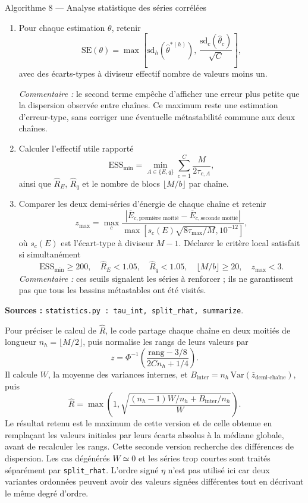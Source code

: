 \documentclass[10pt,a4paper]{article}
\begin{document}
\begin{algocode}{Algorithme 8 --- Analyse statistique des séries corrélées}
\begin{enumerate}
les huit fonctions de l'algorithme 7 puis moyenner sur les chaînes.
\par\textit{Commentaire :} les blocs circulaires évitent de sous-représenter
les bords. Recalculer les variances et le cumulant à chaque tirage transmet
l'incertitude à ces fonctions non linéaires. Le rééchantillonnage est fait
séparément dans chaque chaîne et à chaque température.
\item Pour chaque estimation $\theta$, retenir
\[
\mathrm{SE}(\theta)=\max\!\left[
\mathrm{sd}_{h}(\widehat\theta^{*(h)}),\,
\frac{\mathrm{sd}_{c}(\widehat\theta_c)}{\sqrt C}\right],
\]
avec des écarts-types à diviseur effectif nombre de valeurs moins un.
\par\textit{Commentaire :} le second terme empêche d'afficher une erreur
plus petite que la dispersion observée entre chaînes. Ce maximum reste
une estimation d'erreur-type, sans corriger une éventuelle métastabilité
commune aux deux chaînes.
\item Calculer l'effectif utile rapporté
\[
\mathrm{ESS}_{\min}=\min_{A\in\{E,q\}}
       \sum_{c=1}^C\frac{M}{2\tau_{c,A}},
\]
ainsi que $\widehat R_E$, $\widehat R_q$ et le nombre de blocs
$\lfloor M/b\rfloor$ par chaîne.
\item Comparer les deux demi-séries d'énergie de chaque chaîne et retenir
\[
z_{\max}=\max_c
\frac{|\overline E_{c,\text{première moitié}}
       -\overline E_{c,\text{seconde moitié}}|}
{\max[s_c(E)\sqrt{8\tau_{\max}/M},10^{-12}]},
\]
où $s_c(E)$ est l'écart-type à diviseur $M-1$. Déclarer le critère local
satisfait si simultanément
\[
\mathrm{ESS}_{\min}\ge200,\quad\widehat R_E<1.05,\quad
\widehat R_q<1.05,\quad\lfloor M/b\rfloor\ge20,\quad z_{\max}<3.
\]
\textit{Commentaire :} ces seuils signalent les séries à renforcer ; ils
ne garantissent pas que tous les bassins métastables ont été visités.
\end{enumerate}
\textbf{Sources :} \texttt{statistics.py : tau\_int, split\_rhat, summarize}.
\end{algocode}

Pour préciser le calcul de $\widehat R$, le code partage chaque chaîne en
deux moitiés de longueur $n_h=\lfloor M/2\rfloor$, puis normalise les rangs
de leurs valeurs par
\[
z=\Phi^{-1}\!\left(\frac{\mathrm{rang}-3/8}{2Cn_h+1/4}\right).
\]
Il calcule $W$, la moyenne des variances internes, et
$B_{\mathrm{inter}}=n_h\,\mathrm{Var}(\overline z_{\text{demi-chaîne}})$,
puis
\[
\widehat R=\max\!\left(1,
\sqrt{\frac{(n_h-1)W/n_h+B_{\mathrm{inter}}/n_h}{W}}\right).
\]
Le résultat retenu est le maximum de cette version et de celle obtenue
en remplaçant les valeurs initiales par leurs écarts absolus à la médiane
globale, avant de recalculer les rangs. Cette seconde version recherche des
différences de dispersion. Les cas dégénérés $W\simeq0$ et les séries trop
courtes sont traités séparément par \texttt{split\_rhat}. L'ordre signé
$\eta$ n'est pas utilisé ici car deux variantes ordonnées peuvent avoir
des valeurs signées différentes tout en décrivant le même degré d'ordre.
\end{document}
